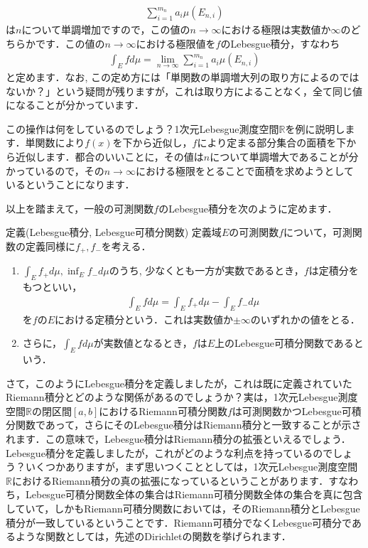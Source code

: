 \begin{eqnarray}
\sum_{i=1}^{m_{n}}a_{i}\mu\left(E_{n,i}\right) \nonumber
\end{eqnarray}
は$n$について単調増加ですので，この値の$n \to \infty$における極限は実数値か$\infty$のどちらかです．この値の$n \to \infty$における極限値を$f$のLebesgue積分，すなわち
\begin{eqnarray}
\int_{E}fd\mu = \lim_{n \to \infty} \sum_{i=1}^{m_{n}}a_{i}\mu\left(E_{n,i}\right) \nonumber
\end{eqnarray}
と定めます．なお, この定め方には「単関数の単調増大列の取り方によるのではないか？」という疑問が残りますが，これは取り方によることなく，全て同じ値になることが分かっています．
\par この操作は何をしているのでしょう？1次元Lebesgue測度空間$\mathbb{R}$を例に説明します．単関数により$f(x)$を下から近似し，$f$により定まる部分集合の面積を下から近似します．都合のいいことに，その値は$n$について単調増大であることが分かっているので，その$n \to \infty$における極限をとることで面積を求めようとしているということになります．
\par 以上を踏まえて，一般の可測関数$f$のLebesgue積分を次のように定めます．
\begin{itembox}[l]{定義(Lebesgue積分, Lebesgue可積分関数)}
定義域$E$の可測関数$f$について，可測関数の定義同様に$f_{+}, f_{-}$を考える．
\begin{enumerate}
\item $\int_{E}f_{+}d\mu, \inf_{E}f_{-}d\mu$のうち, 少なくとも一方が実数であるとき，$f$は定積分をもつといい，
\begin{eqnarray}
\int_{E}fd\mu=\int_{E}f_{+}d\mu - \int_{E}f_{-}d\mu \nonumber
\end{eqnarray}
を$f$の$E$における定積分という．これは実数値か$\pm \infty$のいずれかの値をとる．
\item さらに，$\displaystyle \int_{E}fd\mu$が実数値となるとき，$f$は$E$上のLebesgue可積分関数であるという．
\end{enumerate}
\end{itembox}
\par さて，このようにLebesgue積分を定義しましたが，これは既に定義されていたRiemann積分とどのような関係があるのでしょうか？実は，1次元Lebesgue測度空間$\mathbb{R}$の閉区間$[a,b]$におけるRiemann可積分関数$f$は可測関数かつLebesgue可積分関数であって，さらにそのLebesgue積分はRiemann積分と一致することが示されます．この意味で，Lebesgue積分はRiemann積分の拡張といえるでしょう．
Lebesgue積分を定義しましたが，これがどのような利点を持っているのでしょう？いくつかありますが，まず思いつくこととしては，1次元Lebesgue測度空間$\mathbb{R}$におけるRiemann積分の真の拡張になっているということがあります．すなわち，Lebesgue可積分関数全体の集合はRiemann可積分関数全体の集合を真に包含していて，しかもRiemann可積分関数においては，そのRiemann積分とLebesgue積分が一致しているということです．Riemann可積分でなくLebesgue可積分であるような関数としては，先述のDirichletの関数を挙げられます．
